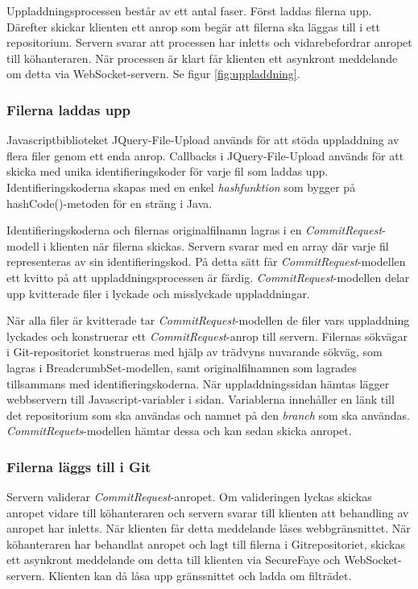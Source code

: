Uppladdningsprocessen består av ett antal faser. Först laddas filerna upp. Därefter skickar klienten ett anrop som begär att filerna ska läggas till i ett repositorium. Servern svarar att processen har inletts och vidarebefordrar anropet till köhanteraren. När processen är klart får klienten ett asynkront meddelande om detta via WebSocket-servern. Se figur \ref{fig:uppladdning}.

\subsubsection{Filerna laddas upp}

Javascriptbiblioteket JQuery-File-Upload används för att stöda uppladdning av flera filer genom ett enda anrop. 
Callbacks i JQuery-File-Upload används för att skicka med unika identifieringskoder för varje fil som laddas upp. Identifieringskoderna skapas med en enkel \emph{hashfunktion} som bygger på hashCode()-metoden för en sträng i Java.

Identifieringskoderna och filernas originalfilnamn lagras i en \emph{CommitRequest}-modell i klienten när filerna skickas. Servern svarar med en array där varje fil representeras av sin identifieringskod. På detta sätt får \emph{CommitRequest}-modellen ett kvitto på att uppladdningsprocessen är färdig. \emph{CommitRequest}-modellen delar upp kvitterade filer i lyckade och misslyckade uppladdningar. 

När alla filer är kvitterade tar \emph{CommitRequest}-modellen de filer vars uppladdning lyckades och konstruerar ett \emph{CommitRequest}-anrop till servern. Filernas sökvägar i Git-repositoriet konstrueras med hjälp av trädvyns nuvarande sökväg, som lagras i BreadcrumbSet-modellen, samt originalfilnamnen som lagrades tillsammans med identifieringskoderna.
När uppladdningssidan hämtas lägger webbservern till Javascript-variabler i sidan. Variablerna innehåller en länk till det  repositorium som ska användas och namnet på den \emph{branch} som ska användas. \emph{CommitRequets}-modellen hämtar dessa och kan sedan skicka anropet.

\subsubsection{Filerna läggs till i Git}

Servern validerar \emph{CommitRequest}-anropet. Om valideringen lyckas skickas anropet vidare till köhanteraren och servern svarar till klienten att behandling av anropet har inletts. När klienten får detta meddelande låses webbgränsnittet.
När köhanteraren har behandlat anropet och lagt till filerna i Gitrepositoriet, skickas ett asynkront meddelande om detta till klienten via SecureFaye och WebSocket-servern. Klienten kan då låsa upp gränssnittet och ladda om filträdet.

